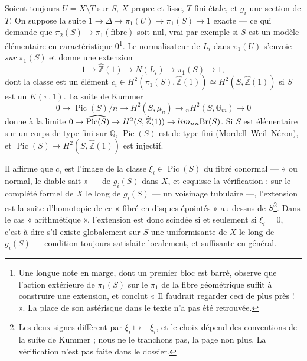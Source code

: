 \documentclass[11pt,a4paper]{article}
\begin{document}
Soient toujours $U = X \setminus T$ sur $S$, $X$ propre et lisse, $T$ fini
étale, et $g_i$ une section de $T$. On suppose la suite $1 \to \Delta \to
\pi_1(U) \to \pi_1(S) \to 1$ exacte — ce qui demande que $\pi_2(S) \to
\pi_1(\text{fibre})$ soit nul, vrai par exemple si $S$ est un modèle élémentaire
en caractéristique $0$\footnote{Une longue note en marge, dont un premier bloc
est barré, observe que l'action extérieure de $\pi_1(S)$ sur le $\pi_1$ de la
fibre géométrique suffit à construire une extension, et conclut « Il faudrait
regarder ceci de plus près ! ». La place de son astérisque dans le texte n'a
pas été retrouvée.}. Le normalisateur de $L_i$ dans $\pi_1(U)$ s'envoie
\emph{sur} $\pi_1(S)$ et donne une extension
\[
1 \longrightarrow \widehat{\mathbb{Z}}(1) \longrightarrow N(L_i)
\longrightarrow \pi_1(S) \longrightarrow 1,
\]
dont la classe est un élément $c_i \in H^2(\pi_1(S), \widehat{\mathbb{Z}}(1))
\simeq H^2(S, \widehat{\mathbb{Z}}(1))$ si $S$ est un $K(\pi, 1)$. La suite de
Kummer
\[
0 \to \operatorname{Pic}(S)/n \to H^2(S, \mu_n) \to {}_nH^2(S, \mathbb{G}_m) \to 0
\]
donne à la limite $0 \to \widehat{\operatorname{Pic}(S)} \to H^2(S,
\widehat{\mathbb{Z}}(1)) \to \varprojlim_n {}_n\mathrm{Br}(S)$. Si $S$ est
élémentaire sur un corps de type fini sur $\mathbb{Q}$, $\operatorname{Pic}(S)$
est de type fini (Mordell–Weil–Néron), et $\operatorname{Pic}(S) \to H^2(S,
\widehat{\mathbb{Z}}(1))$ est injectif.

Il affirme que $c_i$ est l'image de la classe $\xi_i \in \operatorname{Pic}(S)$
du fibré conormal — « ou normal, le diable sait » — de $g_i(S)$ dans $X$, et
esquisse la vérification : sur le complété formel de $X$ le long de $g_i(S)$ —
un voisinage tubulaire —, l'extension est la suite d'homotopie de ce
« fibré en disques épointés » au-dessus de $S$\footnote{Les deux signes
diffèrent par $\xi_i \mapsto -\xi_i$, et le choix dépend des conventions de la
suite de Kummer ; nous ne le tranchons pas, la page non plus. La vérification
n'est pas faite dans le dossier.}. Dans le cas « arithmétique »,
l'extension est donc scindée si et seulement si $\xi_i = 0$, c'est-à-dire s'il
existe globalement sur $S$ une uniformisante de $X$ le long de $g_i(S)$ —
condition toujours satisfaite localement, et suffisante en général.
\end{document}
